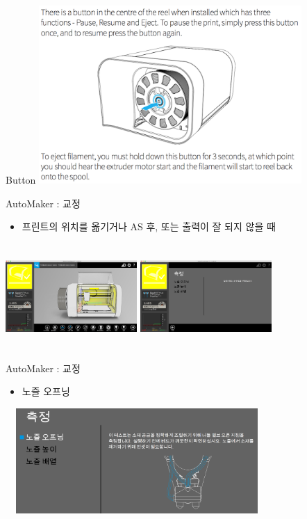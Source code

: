 \documentclass[11pt]{beamer}
\begin{document}
\begin{frame}[t]{Button}\footnotesize
\centering
\includegraphics[width=10cm]{./image/17_04.png}
\end{frame}

\begin{frame}[t]{AutoMaker : 교정 }\footnotesize
\begin{itemize}
\item 프린트의 위치를 옮기거나 AS 후, 또는 출력이 잘 되지 않을 때
\end{itemize}
\includegraphics[width=5cm, height=4cm]{./image/17_27.png} \@ \includegraphics[width=5cm, height=4cm]{./image/17_28.png}
\end{frame}

\begin{frame}[t]{AutoMaker : 교정 }\footnotesize
\begin{itemize}
\item 노즐 오프닝
\end{itemize}
\includegraphics[width=10cm, height=4cm]{./image/17_30.png}
\end{frame}
\end{document}
